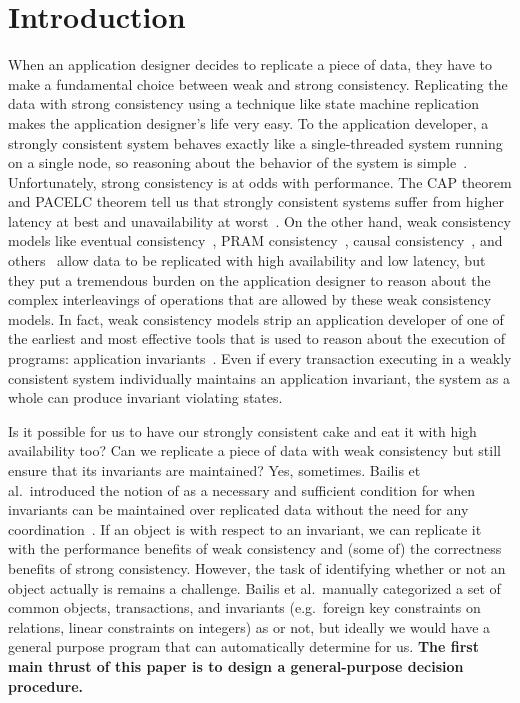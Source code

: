 \section{Introduction}
When an application designer decides to replicate a piece of data, they have to
make a fundamental choice between weak and strong consistency. Replicating the
data with strong consistency using a technique like state machine
replication~\cite{schneider1990implementing, lamport1998part,
liskov2012viewstamped, ongaro2014search, moraru2013there, vincent2015designing,
oki1988viewstamped, lamport2005generalized, lamport2006fast} makes the
application designer's life very easy. To the application developer, a strongly
consistent system behaves exactly like a single-threaded system running on a
single node, so reasoning about the behavior of the system is
simple~\cite{herlihy1990linearizability}.  Unfortunately, strong consistency is
at odds with performance. The CAP theorem and PACELC theorem tell us that
strongly consistent systems suffer from higher latency at best and
unavailability at worst~\cite{gilbert2002brewer, brewer2012cap,
abadi2012consistency}. On the other hand, weak consistency models like eventual
consistency~\cite{vogels2009eventually}, PRAM
consistency~\cite{lipton1988pram}, causal consistency~\cite{ahamad1995causal},
and others~\cite{lloyd2011don, mehdi2017can} allow data to be replicated with
high availability and low latency, but they put a tremendous burden on the
application designer to reason about the complex interleavings of operations
that are allowed by these weak consistency models. In fact, weak consistency
models strip an application developer of one of the earliest and most effective
tools that is used to reason about the execution of programs: application
invariants~\cite{hoare1969axiomatic, balegas2015towards}. Even if every
transaction executing in a weakly consistent system individually maintains an
application invariant, the system as a whole can produce invariant violating
states.

Is it possible for us to have our strongly consistent cake and eat it with high
availability too? Can we replicate a piece of data with weak consistency but
still ensure that its invariants are maintained? Yes, sometimes. Bailis et al.\
introduced the notion of \invariantconfluence{} as a necessary and sufficient
condition for when invariants can be maintained over replicated data without
the need for any coordination~\cite{bailis2014coordination}. If an object is
\invariantconfluent{} with respect to an invariant, we can replicate it with
the performance benefits of weak consistency and (some of) the correctness
benefits of strong consistency. However, the task of identifying whether or not
an object actually is \invariantconfluent{} remains a challenge. Bailis et al.\
manually categorized a set of common objects, transactions, and invariants
(e.g.\ foreign key constraints on relations, linear constraints on integers) as
\invariantconfluent{} or not, but ideally we would have a general purpose
program that can automatically determine \invariantconfluence{} for us.
\textbf{The first main thrust of this paper is to design a general-purpose
\invariantconfluence{} decision procedure.}

